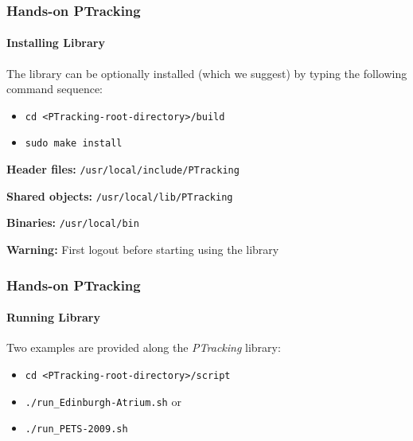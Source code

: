 \begin{frame}
	\frametitle{Hands-on PTracking}
	\framesubtitle{Installing Library}
	
	\Large
	
	\vspace{0.4cm}
	
	The library can be optionally installed (which we suggest) by typing the following command
	sequence:
	
	\vspace{0.2cm}
	
	\begin{itemize}
		\item \texttt{cd <PTracking-root-directory>/build}
		\item \texttt{sudo make install}
	\end{itemize}
	
	\vspace{0.3cm}
	
	\textbf{Header files:} \texttt{/usr/local/include/PTracking} \\
	
	\vspace{0.1cm}
	
	\textbf{Shared objects:} \texttt{/usr/local/lib/PTracking} \\
	
	\vspace{0.1cm}
	
	\textbf{Binaries:} \texttt{/usr/local/bin} \\
	
	\vspace{0.5cm}
	
	\textbf{Warning:} First logout before starting using the library
\end{frame}

\begin{frame}
	\frametitle{Hands-on PTracking}
	\framesubtitle{Running Library}
	
	\Large
	
	Two examples are provided along the \emph{PTracking} library:
	
	\begin{itemize}
		\item \texttt{cd <PTracking-root-directory>/script}
		\item \texttt{./run\_Edinburgh-Atrium.sh} or
		\item \texttt{./run\_PETS-2009.sh}
	\end{itemize}
\end{frame}


